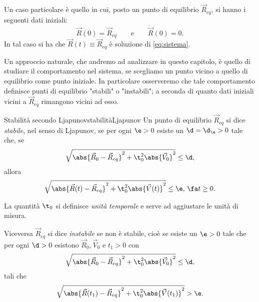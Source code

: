 \begin{ese}
	Un caso particolare è quello in cui, posto un punto di equilibrio \(\vec{R}_{eq}\), si hanno i seguenti dati iniziali:
	\[
		\vec{R}(0) = \vec{R}_{eq} \qquad\text{e}\qquad \dot{\vec{R}}(0) = 0.
	\]
	In tal caso si ha che \(\vec{R}(t) \equiv \vec{R}_{eq}\) è soluzione di \eqref{eq:sistema}.
\end{ese}

Un approccio naturale, che andremo ad analizzare in questo capitolo, è quello di studiare il comportamento nel sistema, se scegliamo un punto vicino a quello di equilibrio come punto iniziale.
In particolare osserveremo che tale comportamento definisce punti di equilibrio "stabili" o "instabili"; a seconda di quanto dati iniziali vicini a \(\vec{R}_{eq}\) rimangono vicini ad esso.

\begin{defn}{Stabilità secondo Ljapunov}{stabilitàLjapunov}
	Un punto di equilibrio \(\vec{R}_{eq}\) si dice \emph{stabile}, nel senso di Ljapunov, se per ogni \(\e>0\) esiste un \(\d=\d_\e>0\) tale che, se
	\[
		\sqrt{\abs{\vec{R}_0-\vec{R}_{eq}}^2 +\t_0^2\abs{\vec{V}_0}^2} \le \d,
	\]
	allora
	\[
		\sqrt{\abs{\vec{R}(t)-\vec{R}_{eq}}^2+\t_0^2\abs{\vec{V}(t)}^2} \le \e,\,\fa t \ge 0.
	\]
\end{defn}

\begin{notz}
	La quantità \(\t_0\) si definisce \emph{unità temporale} e serve ad aggiustare le unità di misura.
\end{notz}

\begin{oss}
	Viceversa \(\vec{R}_{eq}\) si dice \emph{instabile} se non è stabile, cioè se esiste un \(\e>0\) tale che per ogni \(\d>0\) esistono \(\vec{R}_0,\vec{V}_0\) e \(t_1>0\) con
	\[
		\sqrt{\abs{\vec{R}_0-\vec{R}_{eq}}^2 +\t_0^2\abs{\vec{V}_0}^2} \le \d,
	\]
	tali che
	\[
		\sqrt{\abs{\vec{R}(t_1)-\vec{R}_{eq}}^2+\t_0^2\abs{\vec{V}(t_1)}^2} > \e.
	\]
\end{oss}

